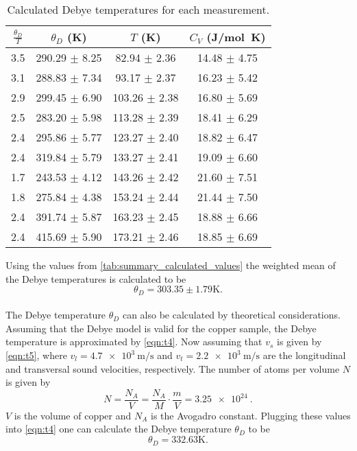 \begin{table}[H]
  \centering
  \caption{Calculated Debye temperatures for each measurement.}
  \label{tab:summary_calculated_values}
  \begin{tabular}{cccc}
      \toprule
      $\frac{\theta_D}{T}$ & $\theta_D$ (\si{\kelvin})& $T$ (\si{\kelvin}) & $C_V$ (\si{\joule/\mol\kelvin}) \\
      \midrule
      3.5 & 290.29 $\pm$ 8.25 & 82.94 $\pm$ 2.36 & 14.48 $\pm$ 4.75 \\
      3.1 & 288.83 $\pm$ 7.34 & 93.17 $\pm$ 2.37 & 16.23 $\pm$ 5.42 \\
      2.9 & 299.45 $\pm$ 6.90 & 103.26 $\pm$ 2.38 & 16.80 $\pm$ 5.69 \\
      2.5 & 283.20 $\pm$ 5.98 & 113.28 $\pm$ 2.39 & 18.41 $\pm$ 6.29 \\
      2.4 & 295.86 $\pm$ 5.77 & 123.27 $\pm$ 2.40 & 18.82 $\pm$ 6.47 \\
      2.4 & 319.84 $\pm$ 5.79 & 133.27 $\pm$ 2.41 & 19.09 $\pm$ 6.60 \\
      1.7 & 243.53 $\pm$ 4.12 & 143.26 $\pm$ 2.42 & 21.60 $\pm$ 7.51 \\
      1.8 & 275.84 $\pm$ 4.38 & 153.24 $\pm$ 2.44 & 21.44 $\pm$ 7.50 \\
      2.4 & 391.74 $\pm$ 5.87 & 163.23 $\pm$ 2.45 & 18.88 $\pm$ 6.66 \\
      2.4 & 415.69 $\pm$ 5.90 & 173.21 $\pm$ 2.46 & 18.85 $\pm$ 6.69 \\
      \bottomrule
  \end{tabular}
\end{table}
Using the values from \autoref{tab:summary_calculated_values} the weighted mean of the Debye temperatures is calculated to be
\begin{equation*}
    \theta_D = 303.35 \pm 1.79 \si{\kelvin}.
\end{equation*}
\\
The Debye temperature $\theta_D$ can also be calculated by theoretical considerations. Assuming that the Debye model is valid for the copper sample,
the Debye temperature is approximated by \autoref{eqn:t4}.
Now assuming that $v_s$ is given by \autoref{eqn:t5},
where $v_l = \SI{4.7e3}{\m\per\s}$ and $v_t = \SI{2.2e3}{\m\per\s}$ \cite{V47} are the longitudinal and transversal sound velocities, respectively. The number of atoms per volume $N$ is given by
\begin{equation*}
    N = \frac{N_A}{V} = \frac{N_A}{M} \cdot \frac{m}{V} = \SI{3.25e24}{}.
\end{equation*}
$V$ is the volume of copper and $N_A$ is the Avogadro constant. Plugging these values into \autoref{eqn:t4} one can calculate the Debye temperature $\theta_D$ to be
\begin{equation*}
    \theta_D = 332.63 \si{\kelvin}.
\end{equation*}